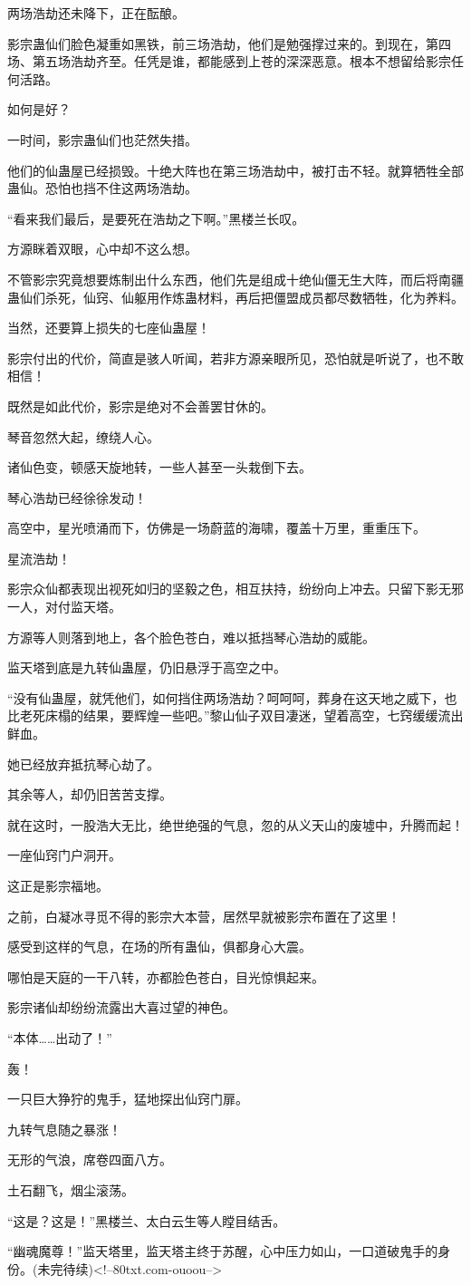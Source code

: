 \begin{this_body}
两场浩劫还未降下，正在酝酿。

影宗蛊仙们脸色凝重如黑铁，前三场浩劫，他们是勉强撑过来的。到现在，第四场、第五场浩劫齐至。任凭是谁，都能感到上苍的深深恶意。根本不想留给影宗任何活路。

如何是好？

一时间，影宗蛊仙们也茫然失措。

他们的仙蛊屋已经损毁。十绝大阵也在第三场浩劫中，被打击不轻。就算牺牲全部蛊仙。恐怕也挡不住这两场浩劫。

“看来我们最后，是要死在浩劫之下啊。”黑楼兰长叹。

方源眯着双眼，心中却不这么想。

不管影宗究竟想要炼制出什么东西，他们先是组成十绝仙僵无生大阵，而后将南疆蛊仙们杀死，仙窍、仙躯用作炼蛊材料，再后把僵盟成员都尽数牺牲，化为养料。

当然，还要算上损失的七座仙蛊屋！

影宗付出的代价，简直是骇人听闻，若非方源亲眼所见，恐怕就是听说了，也不敢相信！

既然是如此代价，影宗是绝对不会善罢甘休的。

琴音忽然大起，缭绕人心。

诸仙色变，顿感天旋地转，一些人甚至一头栽倒下去。

琴心浩劫已经徐徐发动！

高空中，星光喷涌而下，仿佛是一场蔚蓝的海啸，覆盖十万里，重重压下。

星流浩劫！

影宗众仙都表现出视死如归的坚毅之色，相互扶持，纷纷向上冲去。只留下影无邪一人，对付监天塔。

方源等人则落到地上，各个脸色苍白，难以抵挡琴心浩劫的威能。

监天塔到底是九转仙蛊屋，仍旧悬浮于高空之中。

“没有仙蛊屋，就凭他们，如何挡住两场浩劫？呵呵呵，葬身在这天地之威下，也比老死床榻的结果，要辉煌一些吧。”黎山仙子双目凄迷，望着高空，七窍缓缓流出鲜血。

她已经放弃抵抗琴心劫了。

其余等人，却仍旧苦苦支撑。

就在这时，一股浩大无比，绝世绝强的气息，忽的从义天山的废墟中，升腾而起！

一座仙窍门户洞开。

这正是影宗福地。

之前，白凝冰寻觅不得的影宗大本营，居然早就被影宗布置在了这里！

感受到这样的气息，在场的所有蛊仙，俱都身心大震。

哪怕是天庭的一干八转，亦都脸色苍白，目光惊惧起来。

影宗诸仙却纷纷流露出大喜过望的神色。

“本体……出动了！”

轰！

一只巨大狰狞的鬼手，猛地探出仙窍门扉。

九转气息随之暴涨！

无形的气浪，席卷四面八方。

土石翻飞，烟尘滚荡。

“这是？这是！”黑楼兰、太白云生等人瞠目结舌。

“幽魂魔尊！”监天塔里，监天塔主终于苏醒，心中压力如山，一口道破鬼手的身份。(未完待续)<!--80txt.com-ouoou-->

\end{this_body}

